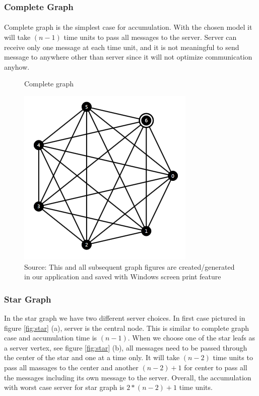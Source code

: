 \documentclass[a4paper,TexShade]{class}
\begin{document}
\subsubsection{Complete Graph}
\paragraph{} Complete graph is the simplest case for accumulation. With the chosen model it will take \textit{ $(n - 1)$ } time units to pass all messages to the server. Server can receive only one message at each time unit, and it is not meaningful to send message to anywhere other than server since it will not optimize communication anyhow.

\bigskip
\begin{figure}[h]
\centering
\caption{Complete graph} \label{fig:complete}
\caption*{Source: This and all subsequent graph figures are created/generated in our application and saved with Windows screen print feature}
\includegraphics[width=0.6\linewidth ,natwidth=320,natheight=324]{images/complete.png}
\end{figure}

\subsubsection{Star Graph}
In the star graph we have two different server choices. In first case pictured in figure \ref{fig:star} (a), server is the central node. This is similar to complete graph case and accumulation time is \textit{$(n - 1)$}. When we choose one of the star leafs as a server vertex, see figure \ref{fig:star} (b), all messages need to be passed through the center of the star and one at a time only. It will take \textit{ $(n - 2)$ } time units to pass all massages to the center and another \textit{ $(n - 2) + 1$ } for center to pass all the messages including its own message to the server. Overall, the accumulation with worst case server for star graph is \textit{ $2* (n - 2) + 1$ } time units.
\end{document}

